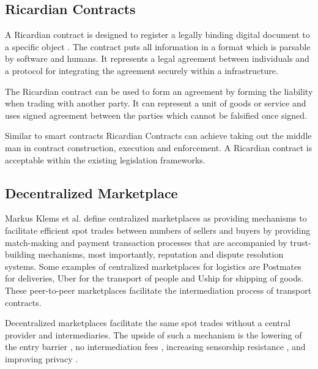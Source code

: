 \subsection{Ricardian Contracts}

A Ricardian contract is designed to register a legally binding digital document to a specific object \cite{grigg2004ricardian}. The contract puts all information in a format which is parsable by software and humans. It represents a legal agreement between individuals and a protocol for integrating the agreement securely within a infrastructure. \par
The Ricardian contract can be used to form an agreement by forming the liability when trading with another party. It can represent a unit of goods or service and uses signed agreement between the parties which cannot be falsified once signed. \par
Similar to smart contracts \cite{buterin2014next} Ricardian Contracts can achieve taking out the middle man in contract construction, execution and enforcement. A Ricardian contract is acceptable within the existing legislation frameworks.

\subsection{Decentralized Marketplace}

Markus Klems et al. define centralized marketplaces\cite{trustlessIntermediationInBCServiceMarket} as providing mechanisms to facilitate efficient spot trades between numbers of sellers and buyers by providing match-making and payment transaction processes that are accompanied by trust-building mechanisms, most importantly, reputation and dispute resolution systems. Some examples of centralized marketplaces for logistics are Postmates for deliveries, Uber for the transport of people and Uship for shipping of goods. These peer-to-peer marketplaces facilitate the intermediation process of transport contracts.\par
Decentralized marketplaces facilitate the same spot trades without a central provider and intermediaries. The upside of such a mechanism is the lowering of the entry barrier \cite{einav2016peer}, no intermediation fees \cite{openbazaar}, increasing sensorship resistance \cite{decentralMarket}, and improving privacy \cite{decentralizedAnonymousReputation}.
